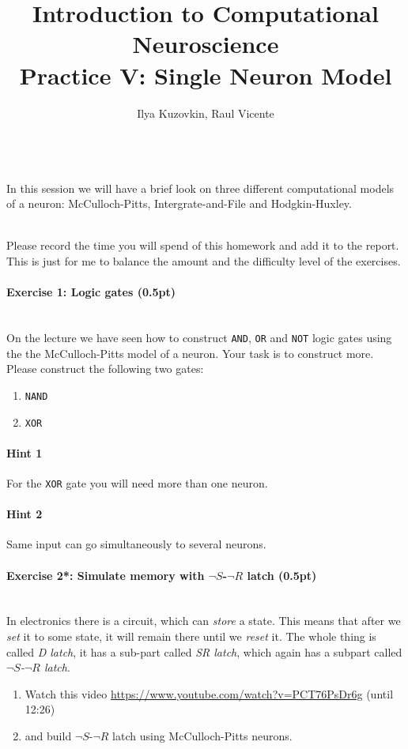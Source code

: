 \documentclass[a4paper,11pt]{article}
\author{\large{Ilya Kuzovkin, Raul Vicente}}
\title{\huge{Introduction to Computational Neuroscience}\\\LARGE{Practice V: Single Neuron Model}}
\newenvironment{exercise}[3]{\paragraph{Exercise #1: #2 (#3pt)}\ \\}{
\medskip}
\begin{document}
\maketitle


%
%
\ \\
In this session we will have a brief look on three different computational models of a neuron: McCulloch-Pitts, Intergrate-and-File and Hodgkin-Huxley.

\ \\
Please record the time you will spend of this homework and add it to the report. This is just for me to balance the amount and the difficulty level of the exercises.



%
%
\begin{exercise}{1}{Logic gates}{0.5}
On the lecture we have seen how to construct \texttt{AND}, \texttt{OR} and \texttt{NOT} logic gates using the the McCulloch-Pitts model of a neuron. Your task is to construct more. Please construct the following two gates:
\begin{enumerate}
\itemsep 0em
	\item \texttt{NAND}
	\item \texttt{XOR}
\end{enumerate}
\paragraph{Hint 1}For the \texttt{XOR} gate you will need more than one neuron.
\paragraph{Hint 2}Same input can go simultaneously to several neurons.
\end{exercise}


%
%
\begin{exercise}{2*}{Simulate memory with $\neg S$-$\neg R$ latch}{0.5}
In electronics there is a circuit, which can \emph{store} a state. This means that after we \emph{set} it to some state, it will remain there until we \emph{reset} it. The whole thing is called \emph{D latch}, it has a sub-part called \emph{SR latch}, which again has a subpart called \emph{$\neg S$-$\neg R$ latch}.
\begin{enumerate}
\itemsep 0em
	\item Watch this video \url{https://www.youtube.com/watch?v=PCT76PsDr6g} (until 12:26)
	\item and build $\neg S$-$\neg R$ latch using McCulloch-Pitts neurons. 
\end{enumerate}
\end{exercise}
\end{document}
